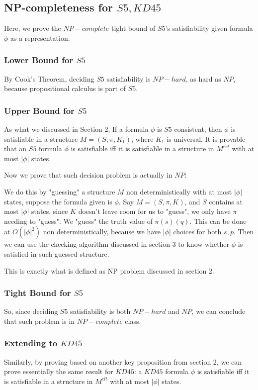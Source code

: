 \documentclass{article}
\begin{document}
\subsection{NP-completeness for $S5, KD45$}
\par Here, we prove the $NP-complete$ tight bound of $S5$'s satisfiability given formula $\phi$ as a representation.
\subsubsection{Lower Bound for $S5$}
\par By Cook's Theorem, deciding $S5$ satisfiability is $NP-hard$, as hard as $NP$, because propositional calculus is part of $S5$.
\subsubsection{Upper Bound for $S5$}
\par As what we discussed in Section 2, If a formula $\phi$ is $S5$ consistent, then $\phi$ is satisfiable in a structure $M=(S,\pi,K_1)$, where $K_1$ is universal, It is provable that an $S5$ formula $\phi$ is satisfiable iff it is satisfiable in a structure in $M^{rst}$ with at most $|\phi|$ states.
\par Now we prove that such decision problem is actually in $NP$:
\par We do this by "guessing" a structure $M$ non deterministically with at most $|\phi|$ states, suppose the formula given is $\phi$. Say $M=(S,\pi,K)$, and $S$ contains at most $|\phi|$ states, since $K$ doesn't leave room for us to "guess", we only have $\pi$ needing to "guess". We "guess" the truth value of $\pi(s)(q)$. This can be done at $O(|\phi|^2)$ non deterministically, because we have $|\phi|$ choices for both $s,p$. Then we can use the checking algorithm discussed in section 3 to know whether $\phi$ is satisfied in such guessed structure. 
\par This is exactly what is defined as NP problem discussed in section 2. 
\subsubsection{Tight Bound for $S5$}
\par So, since deciding $S5$ satisfiability is both $NP-hard$ and $NP$, we can conclude that such problem is in $NP-complete$ class.
\subsubsection{Extending to $KD45$}
\par Similarly, by proving based on another key proposition from section 2, we can prove essentially the same result for $KD45$: a $KD45$ formula $\phi$ is satisfiable iff it is satisfiable in a structure in $M^{elt}$ with at most $|\phi|$ states.
\end{document}
